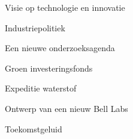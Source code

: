 
\begin{visie-concept}{Visie op technologie en innovatie}\end{visie-concept}

\begin{voorstel-concept}{Industriepolitiek}\end{voorstel-concept}
\begin{voorstel-concept}{Een nieuwe onderzoeksagenda}\end{voorstel-concept}
\begin{voorstel-concept}{Groen investeringsfonds}\end{voorstel-concept}
\begin{voorstel-concept}{Expeditie waterstof}\end{voorstel-concept}
\begin{voorstel-concept}{Ontwerp van een nieuw Bell Labs}\end{voorstel-concept}
\begin{voorstel-concept}{Toekomstgeluid}\end{voorstel-concept}
